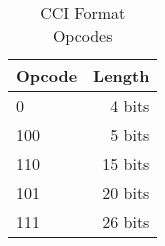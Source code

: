 \begin{table}
	\centering
	\begin{tabular}{lr}
		Opcode & Length \\
		\hline
		0 & 4 bits \\
		100 & 5 bits \\
		110 & 15 bits \\
		101 & 20 bits \\
		111 & 26 bits
	\end{tabular}

	\caption{CCI Format Opcodes}
	\label{tab:bg-comp-opcode-CCIdecodeTable}
\end{table}